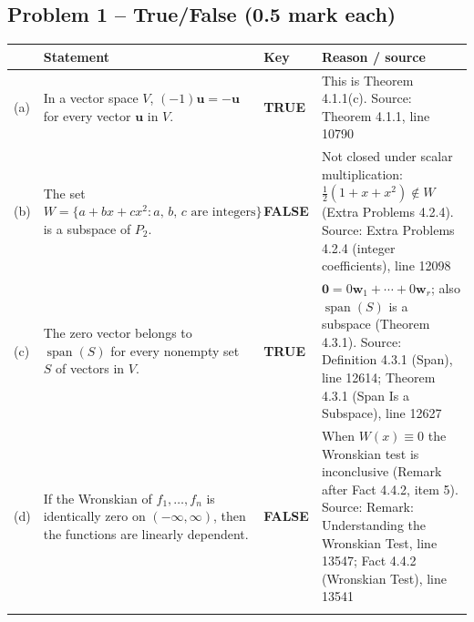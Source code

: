 \documentclass[11pt,a4paper]{article}
\newcommand{\Src}[1]{{\footnotesize\color{black!65}Source: #1}}
\begin{document}
\subsection*{Problem 1 -- True/False (0.5 mark each)}
\begin{tabularx}{\linewidth}{@{}l X l X@{}}\toprule & Statement & Key & Reason / source\\\midrule
(a) & In a vector space $V$, $(-1)\mathbf{u}=-\mathbf{u}$ for every vector $\mathbf{u}$ in $V$. & \textbf{TRUE} & This is Theorem 4.1.1(c). \Src{Theorem 4.1.1, line 10790}\\\addlinespace
(b) & The set $W=\{a+bx+cx^2 : a,\,b,\,c \text{ are integers}\}$ is a subspace of $P_2$. & \textbf{FALSE} & Not closed under scalar multiplication: $\tfrac12(1+x+x^2)\notin W$ (Extra Problems 4.2.4). \Src{Extra Problems 4.2.4 (integer coefficients), line 12098}\\\addlinespace
(c) & The zero vector belongs to $\operatorname{span}(S)$ for every nonempty set $S$ of vectors in $V$. & \textbf{TRUE} & $\mathbf{0}=0\mathbf{w}_1+\cdots+0\mathbf{w}_r$; also $\operatorname{span}(S)$ is a subspace (Theorem 4.3.1). \Src{Definition 4.3.1 (Span), line 12614; Theorem 4.3.1 (Span Is a Subspace), line 12627}\\\addlinespace
(d) & If the Wronskian of $f_1,\dots,f_n$ is identically zero on $(-\infty,\infty)$, then the functions are linearly dependent. & \textbf{FALSE} & When $W(x)\equiv0$ the Wronskian test is inconclusive (Remark after Fact 4.4.2, item 5). \Src{Remark: Understanding the Wronskian Test, line 13547; Fact 4.4.2 (Wronskian Test), line 13541}\\\addlinespace
\bottomrule\end{tabularx}
\end{document}
